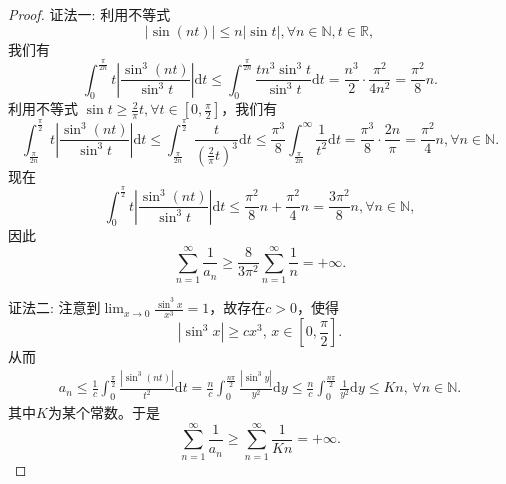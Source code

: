 \documentclass[../../main.tex]{subfiles}
\begin{document}
\begin{proof}
{\color{blue}证法一:}
利用不等式
\[
|\sin (nt)| \leqslant n |\sin t|, \forall n \in \mathbb{N}, t \in \mathbb{R},
\]
我们有
\[
\int_{0}^{\frac{\pi}{2n}} t \left| \frac{\sin^3 (nt)}{\sin^3 t} \right| \mathrm{d}t \leqslant \int_{0}^{\frac{\pi}{2n}} \frac{t n^3 \sin^3 t}{\sin^3 t} \mathrm{d}t = \frac{n^3}{2} \cdot \frac{\pi^2}{4n^2} = \frac{\pi^2}{8} n.
\]
利用不等式 \( \sin t \geqslant \frac{2}{\pi} t, \forall t \in \left[ 0, \frac{\pi}{2} \right] \)，我们有
\[
\int_{\frac{\pi}{2n}}^{\frac{\pi}{2}} t \left| \frac{\sin^3 (nt)}{\sin^3 t} \right| \mathrm{d}t \leqslant \int_{\frac{\pi}{2n}}^{\frac{\pi}{2}} \frac{t}{\left( \frac{2}{\pi} t \right)^3} \mathrm{d}t \leqslant \frac{\pi^3}{8} \int_{\frac{\pi}{2n}}^{\infty} \frac{1}{t^2} \mathrm{d}t = \frac{\pi^3}{8} \cdot \frac{2n}{\pi} = \frac{\pi^2}{4} n, \forall n \in \mathbb{N}.
\]
现在
\[
\int_{0}^{\frac{\pi}{2}} t \left| \frac{\sin^3 (nt)}{\sin^3 t} \right| \mathrm{d}t \leqslant \frac{\pi^2}{8} n + \frac{\pi^2}{4} n = \frac{3\pi^2}{8} n, \forall n \in \mathbb{N},
\]
因此
\[
\sum_{n = 1}^{\infty} \frac{1}{a_n} \geqslant \frac{8}{3\pi^2} \sum_{n = 1}^{\infty} \frac{1}{n} = +\infty.
\]

{\color{blue}证法二:}
注意到$\lim_{x\rightarrow 0}\frac{\sin ^3x}{x^3}=1$，故存在$c>0$，使得
\[
|\sin^3 x| \geqslant c x^3, \, x \in \left[ 0, \frac{\pi}{2} \right].
\]
从而
\begin{align*}
a_n \leqslant \frac{1}{c} \int_0^{\frac{\pi}{2}} \frac{|\sin^3 (nt)|}{t^2} \mathrm{d}t = \frac{n}{c} \int_0^{\frac{n\pi}{2}} \frac{|\sin^3 y|}{y^2} \mathrm{d}y \leqslant \frac{n}{c} \int_0^{\frac{n\pi}{2}} \frac{1}{y^2} \mathrm{d}y \leqslant Kn, \, \forall n \in \mathbb{N}.
\end{align*}
其中$K$为某个常数。于是
\[
\sum_{n=1}^{\infty} \frac{1}{a_n} \geqslant \sum_{n=1}^{\infty} \frac{1}{Kn} = +\infty.
\]

\end{proof}
\end{document}
